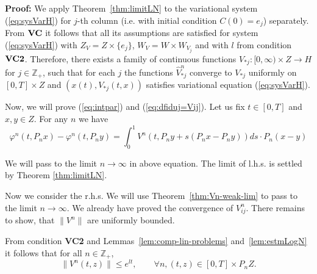 \noindent
\textbf{Proof:}
We apply Theorem~\ref{thm:limitLN} to the variational system (\ref{eq:sysVarH}) for $j$-th column (i.e. with initial condition $C(0)=e_j$) separately. From ${\rm\textbf{VC}}$ it follows that all its assumptions are satisfied for system (\ref{eq:sysVarH}) with $Z_V=Z \times \{e_j\}$, $W_V=W \times W_{V_j}$ and with $l$ from condition ${\rm\textbf{VC}}\mathbf{2}$. Therefore, there exists a family of continuous functions $V_{\ast j}:[0,\infty)\times Z \to H$ for $j \in \mathbb{Z}_+$, such that for each $j$ the functions $\widehat V^{n}_{\ast j}$ converge to $V_{\ast j}$ uniformly on $[0,T] \times Z$ and $(x(t),V_{\ast j}(t,x))$ satisfies variational equation (\ref{eq:sysVarH}).


Now, we will prove (\ref{eq:intpar}) and (\ref{eq:dfiduj=Vij}). Let us fix $t \in [0,T]$ and $x,y\in Z$. For any $n$ we have
\begin{equation*}
  \varphi^n(t,P_n x) - \varphi^n(t,P_n y) =   \int^1_0 V^n(t,P_n y+s(P_n x- P_n y))ds \cdot P_n(x-y)
\end{equation*}

We will pass to the limit $n \to \infty$ in above equation. The limit of l.h.s.
is settled by Theorem \ref{thm:limitLN}.

Now we consider the r.h.s.  We will use Theorem~\ref{thm:Vn-weak-lim} to pass to the limit $n \to \infty$. We already have proved the convergence of $V^n_{ij}$. There remains to show, that $\|V^n\|$ are uniformly bounded.

From condition \textbf{VC2} and Lemmas~\ref{lem:comp-lin-problems} and~\ref{lem:estmLogN} it follows that for all $n\in\mathbb Z_+$,
\begin{equation}
  \|V^n(t,z)\| \leq e^{lt}, \qquad \forall n, (t,z) \in [0,T] \times P_nZ. \label{eq:VnlogN}
\end{equation}


